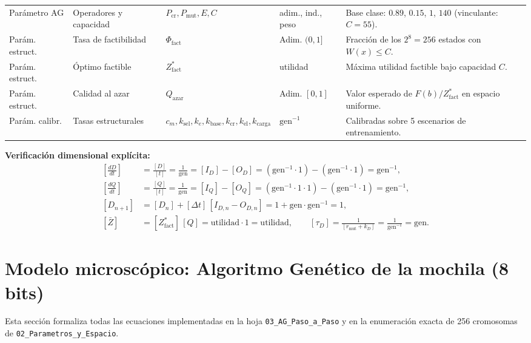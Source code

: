 \documentclass[11pt,a4paper]{article}
\begin{document}
\begin{longtable}{@{}p{2.3cm}p{3.0cm}p{1.6cm}p{2.1cm}p{5.5cm}@{}}
Par\'ametro AG & Operadores y capacidad & $P_{\text{cr}}, P_{\text{mut}}, E, C$ & adim., ind., peso & Base clase: $0.89$, $0.15$, $1$, $140$ (vinculante: $C=55$). \\
Par\'am. estruct. & Tasa de factibilidad & $\Phi_{\text{fact}}$ & Adim. $(0,1]$ & Fracci\'on de los $2^8=256$ estados con $W(x)\le C$. \\
Par\'am. estruct. & \'Optimo factible & $Z^*_{\text{fact}}$ & utilidad & M\'axima utilidad factible bajo capacidad $C$. \\
Par\'am. estruct. & Calidad al azar & $Q_{\text{azar}}$ & Adim. $[0,1]$ & Valor esperado de $F(b)/Z^*_{\text{fact}}$ en espacio uniforme. \\
Par\'am. calibr. & Tasas estructurales & $c_m, k_{\text{sel}}, k_e, k_{\text{base}}, k_{\text{cr}}, k_{\text{el}}, k_{\text{carga}}$ & $\text{gen}^{-1}$ & Calibradas sobre 5 escenarios de entrenamiento. \\
\bottomrule
\end{longtable}

\textbf{Verificaci\'on dimensional expl\'icita:}
\begin{align}
\left[\frac{dD}{dt}\right] &= \frac{[D]}{[t]} = \frac{1}{\text{gen}} = [I_D] - [O_D] = \left(\text{gen}^{-1}\cdot 1\right) - \left(\text{gen}^{-1}\cdot 1\right) = \text{gen}^{-1}, \\
\left[\frac{dQ}{dt}\right] &= \frac{[Q]}{[t]} = \frac{1}{\text{gen}} = [I_Q] - [O_Q] = \left(\text{gen}^{-1}\cdot 1\cdot 1\right) - \left(\text{gen}^{-1}\cdot 1\right) = \text{gen}^{-1}, \\
[D_{n+1}] &= [D_n] + [\Delta t]\,[I_{D,n} - O_{D,n}] = 1 + \text{gen}\cdot\text{gen}^{-1} = 1, \\
[\bar{Z}] &= [Z^*_{\text{fact}}]\,[Q] = \text{utilidad}\cdot 1 = \text{utilidad}, \qquad
[\tau_D] = \frac{1}{[r_{\text{mut}} + k_D]} = \frac{1}{\text{gen}^{-1}} = \text{gen}.
\end{align}

\section{Modelo microsc\'opico: Algoritmo Gen\'etico de la mochila (8 bits)}

Esta secci\'on formaliza todas las ecuaciones implementadas en la hoja \texttt{03\_AG\_Paso\_a\_Paso} y en la enumeraci\'on exacta de 256 cromosomas de \texttt{02\_Parametros\_y\_Espacio}.
\end{document}

